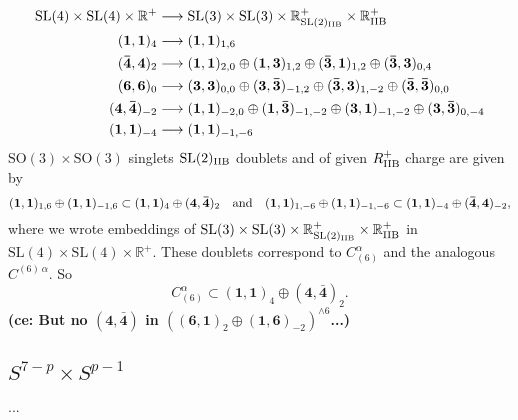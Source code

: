 \documentclass[11pt]{article}
\newcommand{\SO}{\ensuremath{\mathrm{SO}}\xspace}
\newcommand{\SL}{\ensuremath{\mathrm{SL}}\xspace}
\newcommand{\R}{\ensuremath{\mathbb{R}}\xspace}
\newcommand{\ce}[1]{\marginpar{\parbox{\marginparwidth}{\boldmath $\Longleftarrow$}}
{\boldmath\bfseries (ce: #1)}}
\begin{document}
  \begin{equation}
    \begin{aligned}
    \SL(4) \times \SL(4) \times \R^{+} & \longrightarrow \SL(3) \times \SL(3) \times \R^{+}_{\SL(2)_{\rm IIB}} \times \R^{+}_{\rm IIB} \\
    (\bm{1},\bm{1})_{4} & \longrightarrow (\bm{1},\bm{1})_{1,6}\\
    (\bm{\bar{4}},\bm{4})_{2} & \longrightarrow (\bm{1},\bm{1})_{2,0} \oplus (\bm{1},\bm{3})_{1,2} \oplus (\bm{\bar{3}},\bm{1})_{1,2} \oplus (\bm{\bar{3}},\bm{3})_{0,4} \\
    (\bm{6},\bm{6})_{0} & \longrightarrow (\bm{3},\bm{3})_{0,0} \oplus (\bm{3},\bm{\bar{3}})_{-1,2} \oplus (\bm{\bar{3}},\bm{3})_{1,-2} \oplus (\bm{\bar{3}},\bm{\bar{3}})_{0,0} \\
    (\bm{4},\bm{\bar{4}})_{-2} & \longrightarrow (\bm{1},\bm{1})_{-2,0} \oplus (\bm{1},\bm{\bar{3}})_{-1,-2} \oplus (\bm{3},\bm{1})_{-1,-2} \oplus (\bm{3},\bm{\bar{3}})_{0,-4} \\
    (\bm{1},\bm{1})_{-4} & \longrightarrow (\bm{1},\bm{1})_{-1,-6}
    \end{aligned}
  \end{equation}
  $\SO(3)\times\SO(3)$ singlets $\SL(2)_{\rm IIB}$ doublets and of given $R_{\rm IIB}^{+}$ charge are given by
  \begin{equation}
    (\bm{1},\bm{1})_{1,6} \oplus (\bm{1},\bm{1})_{-1,6} \subset (\bm{1},\bm{1})_{4} \oplus (\bm{4}, \bm{\bar{4}})_{2} \quad {\rm and} \quad (\bm{1},\bm{1})_{1,-6} \oplus (\bm{1},\bm{1})_{-1,-6} \subset (\bm{1},\bm{1})_{-4} \oplus (\bm{\bar{4}}, \bm{4})_{-2},
  \end{equation}
  where we wrote embeddings of $\SL(3) \times \SL(3) \times \R^{+}_{\SL(2)_{\rm IIB}} \times \R^{+}_{\rm IIB}$ in $\SL(4) \times \SL(4) \times \R^{+}$. These doublets correspond to $C_{(6)}^{\alpha}$ and the analogous $C^{(6)\,\alpha}$. So
  \begin{equation}
    C_{(6)}^{\alpha} \subset (\bm{1},\bm{1})_{4} \oplus (\bm{4},\bm{\bar{4}})_{2}.
  \end{equation}
  \ce{But no $(\bm{4},\bm{\bar{4}})$ in $\left((\bm{6},\bm{1})_{2}\oplus(\bm{1},\bm{6})_{-2}\right)^{\wedge 6}$...}

  \subsection{\texorpdfstring{$S^{7-p}\times S^{p-1}$}{S7-pxSp-1}}
  ...
\end{document}
